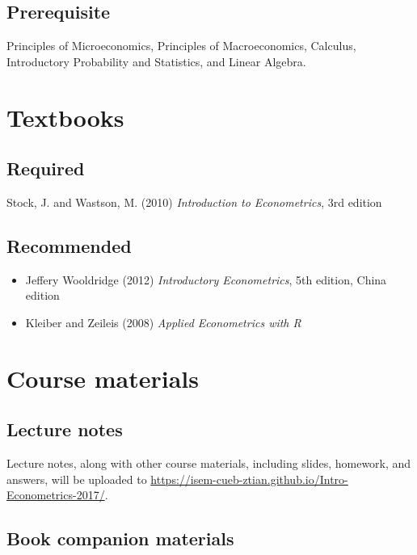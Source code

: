 \documentclass[a4paper,11pt]{article}
\begin{document}
\subsection*{Prerequisite}
\label{sec:orgac07e4c}

Principles of Microeconomics, Principles of Macroeconomics, Calculus,
Introductory Probability and Statistics, and Linear Algebra.


\section{Textbooks}
\label{sec:org5438746}
\subsection*{Required}
\label{sec:orgc0e76df}

Stock, J. and Wastson, M. (2010) \emph{Introduction to Econometrics}, 3rd
edition

\subsection*{Recommended}
\label{sec:org91c8052}

\begin{itemize}
\item Jeffery Wooldridge (2012) \emph{Introductory Econometrics}, 5th edition, China edition

\item Kleiber and Zeileis (2008) \emph{Applied Econometrics with R}
\end{itemize}


\section{Course materials}
\label{sec:org5a7cdfb}
\subsection*{Lecture notes}
\label{sec:orge91895c}

Lecture notes, along with other course materials, including slides,
homework, and answers, will be uploaded to
\url{https://isem-cueb-ztian.github.io/Intro-Econometrics-2017/}. 

\subsection*{Book companion materials}
\label{sec:org8f85f84}
\end{document}
